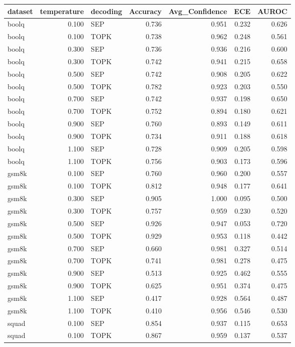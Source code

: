 \begin{tabular}{lrlrrrr}
\toprule
dataset & temperature & decoding & Accuracy & Avg_Confidence & ECE & AUROC \\
\midrule
boolq & 0.100 & SEP & 0.736 & 0.951 & 0.232 & 0.626 \\
boolq & 0.100 & TOPK & 0.738 & 0.962 & 0.248 & 0.561 \\
boolq & 0.300 & SEP & 0.736 & 0.936 & 0.216 & 0.600 \\
boolq & 0.300 & TOPK & 0.742 & 0.941 & 0.215 & 0.658 \\
boolq & 0.500 & SEP & 0.742 & 0.908 & 0.205 & 0.622 \\
boolq & 0.500 & TOPK & 0.782 & 0.923 & 0.203 & 0.550 \\
boolq & 0.700 & SEP & 0.742 & 0.937 & 0.198 & 0.650 \\
boolq & 0.700 & TOPK & 0.752 & 0.894 & 0.180 & 0.621 \\
boolq & 0.900 & SEP & 0.760 & 0.893 & 0.149 & 0.611 \\
boolq & 0.900 & TOPK & 0.734 & 0.911 & 0.188 & 0.618 \\
boolq & 1.100 & SEP & 0.728 & 0.909 & 0.205 & 0.598 \\
boolq & 1.100 & TOPK & 0.756 & 0.903 & 0.173 & 0.596 \\
gsm8k & 0.100 & SEP & 0.760 & 0.960 & 0.200 & 0.557 \\
gsm8k & 0.100 & TOPK & 0.812 & 0.948 & 0.177 & 0.641 \\
gsm8k & 0.300 & SEP & 0.905 & 1.000 & 0.095 & 0.500 \\
gsm8k & 0.300 & TOPK & 0.757 & 0.959 & 0.230 & 0.520 \\
gsm8k & 0.500 & SEP & 0.926 & 0.947 & 0.053 & 0.720 \\
gsm8k & 0.500 & TOPK & 0.929 & 0.953 & 0.118 & 0.442 \\
gsm8k & 0.700 & SEP & 0.660 & 0.981 & 0.327 & 0.514 \\
gsm8k & 0.700 & TOPK & 0.741 & 0.981 & 0.278 & 0.475 \\
gsm8k & 0.900 & SEP & 0.513 & 0.925 & 0.462 & 0.555 \\
gsm8k & 0.900 & TOPK & 0.625 & 0.951 & 0.374 & 0.475 \\
gsm8k & 1.100 & SEP & 0.417 & 0.928 & 0.564 & 0.487 \\
gsm8k & 1.100 & TOPK & 0.410 & 0.956 & 0.546 & 0.530 \\
squad & 0.100 & SEP & 0.854 & 0.937 & 0.115 & 0.653 \\
squad & 0.100 & TOPK & 0.867 & 0.959 & 0.137 & 0.537 \\

\end{tabular}
